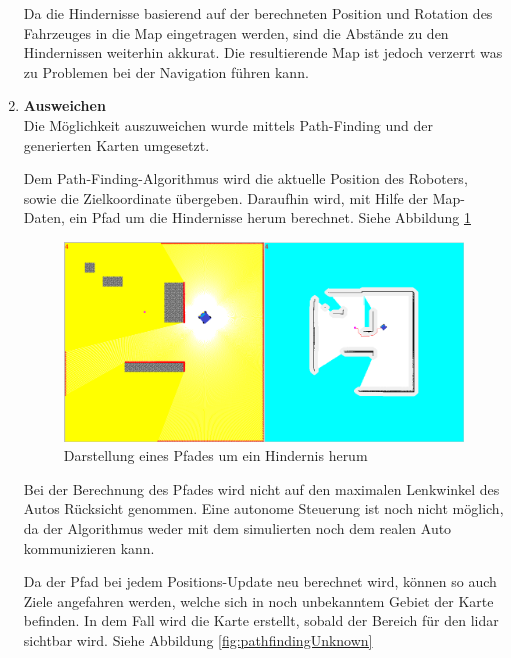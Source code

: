 \begin{enumerate}[leftmargin=*]
    Da die Hindernisse basierend auf der berechneten Position und Rotation des Fahrzeuges in die Map eingetragen werden,
    sind die Abstände zu den Hindernissen weiterhin akkurat.
    Die resultierende Map ist jedoch verzerrt was zu Problemen bei der Navigation führen kann.

    \newpage
    \item \textbf{Ausweichen} \\
    Die Möglichkeit auszuweichen wurde mittels Path-Finding und der generierten Karten umgesetzt.
    
    Dem Path-Finding-Algorithmus wird die aktuelle Position des Roboters, sowie die Zielkoordinate übergeben.
    Daraufhin wird, mit Hilfe der Map-Daten, ein Pfad um die Hindernisse herum berechnet.
    Siehe Abbildung \ref{fig:pathfinding}
    \begin{figure}[H]
        \centering
        \includegraphics[width=12cm]{graphics/pathfinding.png}
        \caption{Darstellung eines Pfades um ein Hindernis herum}
        \label{fig:pathfinding}
    \end{figure}

    Bei der Berechnung des Pfades wird nicht auf den maximalen Lenkwinkel des Autos Rücksicht genommen.
    Eine autonome Steuerung ist noch nicht möglich, da der Algorithmus weder mit dem simulierten noch dem realen Auto kommunizieren kann.

    Da der Pfad bei jedem Positions-Update neu berechnet wird, können so auch Ziele angefahren werden,
    welche sich in noch unbekanntem Gebiet der Karte befinden.
    In dem Fall wird die Karte erstellt, sobald der Bereich für den \ac{lidar} sichtbar wird.
    Siehe Abbildung \ref{fig:pathfindingUnknown}


\end{enumerate}
